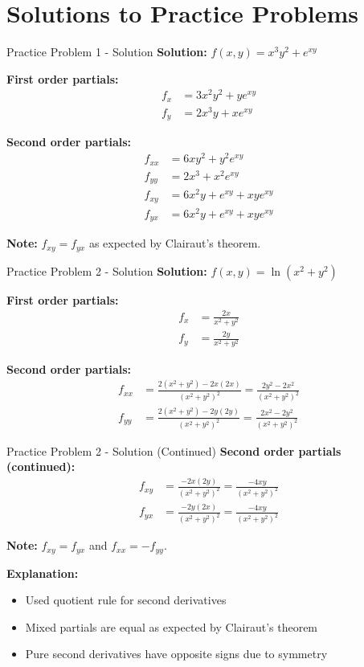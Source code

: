 \documentclass[aspectratio=169]{beamer}
\begin{document}
\section{Solutions to Practice Problems}

\begin{frame}{Practice Problem 1 - Solution}
\textbf{Solution:} $f(x,y) = x^3y^2 + e^{xy}$

\textbf{First order partials:}
\begin{align*}
    f_x &= 3x^2y^2 + ye^{xy} \\
    f_y &= 2x^3y + xe^{xy}
\end{align*}

\textbf{Second order partials:}
\begin{align*}
    f_{xx} &= 6xy^2 + y^2e^{xy} \\
    f_{yy} &= 2x^3 + x^2e^{xy} \\
    f_{xy} &= 6x^2y + e^{xy} + xye^{xy} \\
    f_{yx} &= 6x^2y + e^{xy} + xye^{xy}
\end{align*}

\textbf{Note:} $f_{xy} = f_{yx}$ as expected by Clairaut's theorem.
\end{frame}

\begin{frame}{Practice Problem 2 - Solution}
\textbf{Solution:} $f(x,y) = \ln(x^2 + y^2)$

\textbf{First order partials:}
\begin{align*}
    f_x &= \frac{2x}{x^2 + y^2} \\
    f_y &= \frac{2y}{x^2 + y^2}
\end{align*}

\textbf{Second order partials:}
\begin{align*}
    f_{xx} &= \frac{2(x^2 + y^2) - 2x(2x)}{(x^2 + y^2)^2} = \frac{2y^2 - 2x^2}{(x^2 + y^2)^2} \\
    f_{yy} &= \frac{2(x^2 + y^2) - 2y(2y)}{(x^2 + y^2)^2} = \frac{2x^2 - 2y^2}{(x^2 + y^2)^2}
\end{align*}
\end{frame}

\begin{frame}{Practice Problem 2 - Solution (Continued)}
\textbf{Second order partials (continued):}
\begin{align*}
    f_{xy} &= \frac{-2x(2y)}{(x^2 + y^2)^2} = \frac{-4xy}{(x^2 + y^2)^2} \\
    f_{yx} &= \frac{-2y(2x)}{(x^2 + y^2)^2} = \frac{-4xy}{(x^2 + y^2)^2}
\end{align*}

\textbf{Note:} $f_{xy} = f_{yx}$ and $f_{xx} = -f_{yy}$.

\textbf{Explanation:}
\begin{itemize}
    \item Used quotient rule for second derivatives
    \item Mixed partials are equal as expected by Clairaut's theorem
    \item Pure second derivatives have opposite signs due to symmetry
\end{itemize}
\end{frame}
\end{document}

